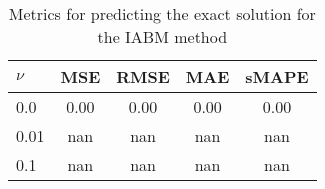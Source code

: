 \begin{table}
  \caption{Metrics for predicting the exact solution for the IABM method}\label{table:comparison_exact_metrics_iabm}
  \centering
  \begin{tabular}{lcccc}
    \toprule
    \(\nu \) & MSE  & RMSE & MAE  & sMAPE \\
    \midrule
    0.0      & 0.00 & 0.00 & 0.00 & 0.00  \\
    0.01     & nan  & nan  & nan  & nan   \\
    0.1      & nan  & nan  & nan  & nan   \\
    \bottomrule
  \end{tabular}
\end{table}



